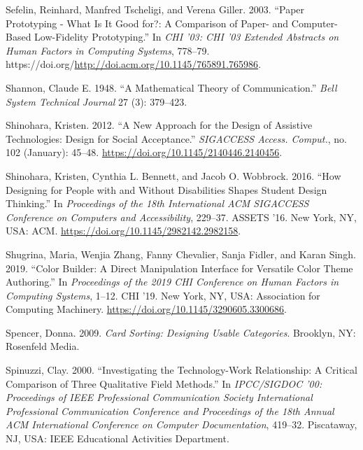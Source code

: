 \begin{CSLReferences}{1}{0}
\leavevmode{}%
Sefelin, Reinhard, Manfred Tscheligi, and Verena Giller. 2003. {``Paper
Prototyping - What Is It Good for?: A Comparison of Paper- and
Computer-Based Low-Fidelity Prototyping.''} In \emph{{CHI} '03: {CHI}
'03 Extended Abstracts on Human Factors in Computing Systems}, 778--79.
https://doi.org/\url{http://doi.acm.org/10.1145/765891.765986}.

\leavevmode{}%
Shannon, Claude E. 1948. {``A Mathematical Theory of Communication.''}
\emph{Bell System Technical Journal} 27 (3): 379--423.

\leavevmode{}%
Shinohara, Kristen. 2012. {``A New Approach for the Design of Assistive
Technologies: Design for Social Acceptance.''} \emph{SIGACCESS Access.
Comput.}, no. 102 (January): 45--48.
\url{https://doi.org/10.1145/2140446.2140456}.

\leavevmode{}%
Shinohara, Kristen, Cynthia L. Bennett, and Jacob O. Wobbrock. 2016.
{``How Designing for People with and Without Disabilities Shapes Student
Design Thinking.''} In \emph{Proceedings of the 18th International {ACM}
{SIGACCESS} Conference on Computers and Accessibility}, 229--37. ASSETS
'16. New York, NY, USA: ACM.
\url{https://doi.org/10.1145/2982142.2982158}.

\leavevmode{}%
Shugrina, Maria, Wenjia Zhang, Fanny Chevalier, Sanja Fidler, and Karan
Singh. 2019. {``Color Builder: A Direct Manipulation Interface for
Versatile Color Theme Authoring.''} In \emph{Proceedings of the 2019 CHI
Conference on Human Factors in Computing Systems}, 1--12. CHI '19. New
York, NY, USA: Association for Computing Machinery.
\url{https://doi.org/10.1145/3290605.3300686}.

\leavevmode{}%
Spencer, Donna. 2009. \emph{Card Sorting: Designing Usable Categories}.
Brooklyn, NY: Rosenfeld Media.

\leavevmode{}%
Spinuzzi, Clay. 2000. {``Investigating the Technology-Work Relationship:
A Critical Comparison of Three Qualitative Field Methods.''} In
\emph{IPCC/SIGDOC '00: Proceedings of IEEE Professional Communication
Society International Professional Communication Conference and
Proceedings of the 18th Annual ACM International Conference on Computer
Documentation}, 419--32. Piscataway, NJ, USA: IEEE Educational
Activities Department.


\end{CSLReferences}
